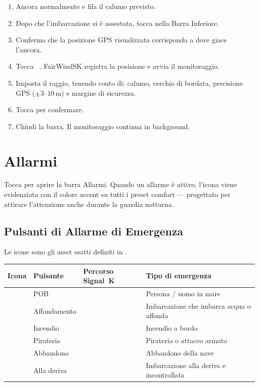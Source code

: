 \begin{enumerate}
  \item Ancora normalmente e fila il calumo previsto.
  \item Dopo che l'imbarcazione si è assestata, tocca  nella Barra Inferiore.
  \item Conferma che la posizione GPS visualizzata corrisponda a dove giace l'ancora.
  \item Tocca ~. FairWindSK registra la posizione e avvia il monitoraggio.
  \item Imposta il raggio, tenendo conto di: calumo, cerchio di bordata, precisione GPS
        ($\pm3$--$10$\,m) e margine di sicurezza.
  \item Tocca  per confermare.
  \item Chiudi la barra. Il monitoraggio continua in background.
\end{enumerate}

\chapter{Allarmi}
\label{ch:allarmi}

Tocca  per aprire la barra Allarmi.
Quando un allarme è attivo, l'icona viene evidenziata con il colore accent su tutti i preset
comfort --- progettato per attirare l'attenzione anche durante la guardia notturna.


\section{Pulsanti di Allarme di Emergenza}

Le icone sono gli asset esatti definiti in .

\begin{longtable}{C{1.4cm}L{2.2cm}L{4.0cm}L{6.5cm}}
\toprule
{}
\color{white}\sffamily\bfseries Icona &
\color{white}\sffamily\bfseries Pulsante &
\color{white}\sffamily\bfseries Percorso Signal~K &
\color{white}\sffamily\bfseries Tipo di emergenza \\
\midrule
{}     & POB          &      & Persona / uomo in mare \\
 & Affondamento &  & Imbarcazione che imbarca acqua o affonda \\
    & Incendio     &     & Incendio a bordo \\
  & Pirateria    &   & Pirateria o attacco armato \\
 & Abbandono    &  & Abbandono della nave \\
  & Alla deriva  &   & Imbarcazione alla deriva e incontrollata \\
\bottomrule
\end{longtable}

